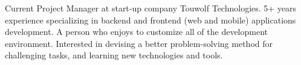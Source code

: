 
\begin{cvparagraph}

Current Project Manager at start-up company Touwolf Technologies. 5+ years experience specializing in backend and frontend (web and mobile) applications development. A person who enjoys to customize all of the development environment. Interested in devising a better problem-solving method for challenging tasks, and learning new technologies and tools.
\end{cvparagraph}
